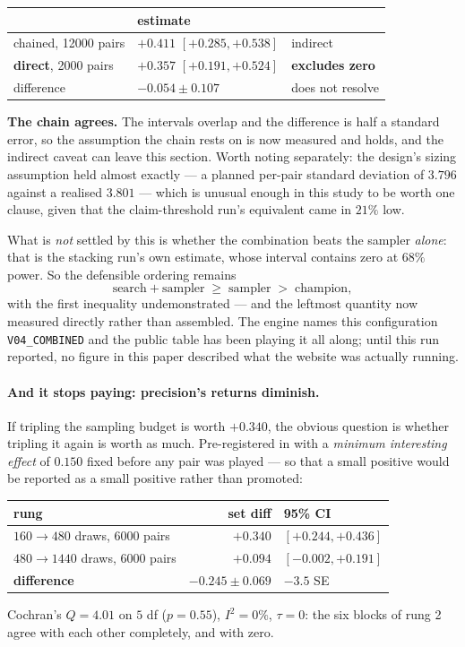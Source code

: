 \documentclass[11pt,a4paper]{article}
\begin{document}
\begin{center}
\small
\begin{tabular}{lll}
\toprule
& estimate & \\
\midrule
chained, 12000 pairs & $+0.411$ $[+0.285, +0.538]$ & indirect \\
\textbf{direct}, 2000 pairs & $\mathbf{+0.357}$ $[+0.191, +0.524]$ & \textbf{excludes zero} \\
\midrule
difference & $-0.054 \pm 0.107$ & does not resolve \\
\bottomrule
\end{tabular}
\end{center}

\textbf{The chain agrees.} The intervals overlap and the difference is half a
standard error, so the assumption the chain rests on is now measured and holds,
and the indirect caveat can leave this section. Worth noting separately: the
design's sizing assumption held almost exactly --- a planned per-pair standard
deviation of $3.796$ against a realised $3.801$ --- which is unusual enough in
this study to be worth one clause, given that the claim-threshold run's
equivalent came in $21\%$ low.

What is \emph{not} settled by this is whether the combination beats the sampler
\emph{alone}: that is the stacking run's own estimate, whose interval contains
zero at $68\%$ power. So the defensible ordering remains
\[
  \text{search}+\text{sampler} \;\ge\; \text{sampler} \;>\; \text{champion},
\]
with the first inequality undemonstrated --- and the leftmost quantity now
measured directly rather than assembled. The engine names this configuration
\texttt{V04\_COMBINED} and the public table has been playing it all along;
until this run reported, no figure in this paper described what the website was
actually running.

\paragraph{And it stops paying: precision's returns diminish.} If tripling the
sampling budget is worth $+0.340$, the obvious question is whether tripling it
again is worth as much. Pre-registered in
 with a \emph{minimum interesting
effect} of $0.150$ fixed before any pair was played --- so that a small positive
would be reported as a small positive rather than promoted:
\begin{center}
\begin{tabular}{lrl}
\toprule
rung & set diff & 95\% CI \\
\midrule
$160 \to 480$ draws, 6000 pairs & $\mathbf{+0.340}$ & $[+0.244, +0.436]$ \\
$480 \to 1440$ draws, 6000 pairs & $+0.094$ & $[-0.002, +0.191]$ \\
\midrule
\textbf{difference} & $\mathbf{-0.245 \pm 0.069}$ & $\mathbf{-3.5}$ SE \\
\bottomrule
\end{tabular}
\end{center}
Cochran's $Q = 4.01$ on $5$ df ($p = 0.55$), $I^2 = 0\%$, $\tau = 0$: the six
blocks of rung 2 agree with each other completely, and with zero.
\end{document}
